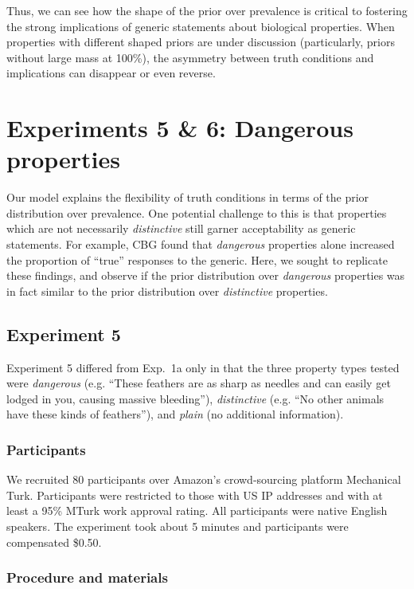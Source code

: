 \documentclass[10pt,letterpaper]{article}
\begin{document}
Thus, we can see how the shape of the prior over prevalence is critical to fostering the strong implications of generic statements about biological properties. When properties with different shaped priors are under discussion (particularly, priors without large mass at 100\%), the asymmetry between truth conditions and implications can disappear or even reverse.

\section{Experiments 5 \& 6: Dangerous properties}

Our model explains the flexibility of truth conditions in terms of the prior distribution over prevalence. One potential challenge to this is that properties which are not necessarily \emph{distinctive} still garner acceptability as generic statements. For example, CBG found that \emph{dangerous} properties alone increased the proportion of ``true'' responses to the generic. Here, we sought to replicate these findings, and observe if the prior distribution over \emph{dangerous} properties was in fact similar to the prior distribution over \emph{distinctive} properties. 

\subsection{Experiment 5}

Experiment 5 differed from Exp.~1a only in that the three property types tested were \emph{dangerous} (e.g. ``These feathers are as sharp as needles and can easily get lodged in you, causing massive bleeding''),  \emph{distinctive} (e.g. ``No other animals have these kinds of feathers''), and \emph{plain} (no additional information). 

\subsubsection{Participants}

We recruited 80 participants over Amazon's crowd-sourcing platform Mechanical Turk. Participants were restricted to those with US IP addresses and with at least a 95\% MTurk work approval rating. All participants were native English speakers. The experiment took about 5 minutes and participants were compensated \$0.50.

\subsubsection{Procedure and materials}
\end{document}
